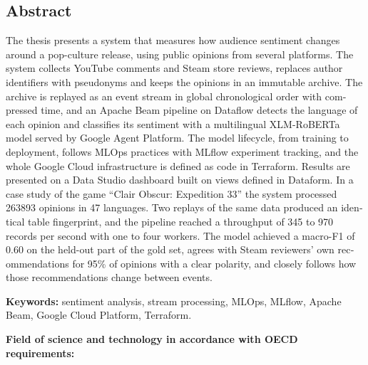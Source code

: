 \begin{otherlanguage}{english}
  \chapter*{Abstract}

  The thesis presents a system that measures how audience sentiment changes around a pop-culture release, using public opinions from several platforms.
  The system collects YouTube comments and Steam store reviews, replaces author identifiers with pseudonyms and keeps the opinions in an immutable archive.
  The archive is replayed as an event stream in global chronological order with compressed time, and an Apache Beam pipeline on Dataflow detects the language of each opinion and classifies its sentiment with a multilingual XLM-RoBERTa model served by Google Agent Platform.
  The model lifecycle, from training to deployment, follows MLOps practices with MLflow experiment tracking, and the whole Google Cloud infrastructure is defined as code in Terraform.
  Results are presented on a Data Studio dashboard built on views defined in Dataform.
  In a case study of the game \enquote{Clair Obscur: Expedition 33} the system processed \num{263893} opinions in 47 languages.
  Two replays of the same data produced an identical table fingerprint, and the pipeline reached a throughput of 345 to 970 records per second with one to four workers.
  The model achieved a macro-F1 of 0.60 on the held-out part of the gold set, agrees with Steam reviewers' own recommendations for 95\% of opinions with a clear polarity, and closely follows how those recommendations change between events.

  \bigskip
  \noindent\textbf{Keywords:} sentiment analysis, stream processing, MLOps, MLflow, Apache Beam, Google Cloud Platform, Terraform.

  \noindent\textbf{Field of science and technology in accordance with OECD requirements:} 
\end{otherlanguage}
